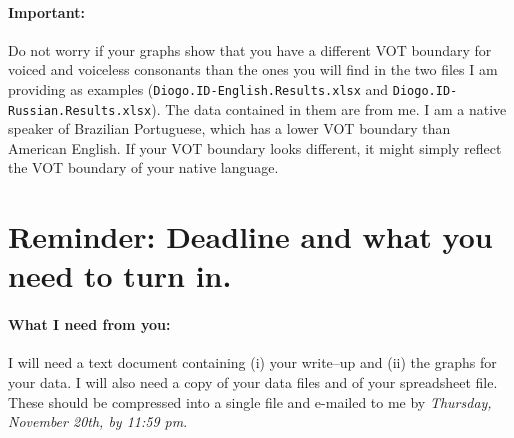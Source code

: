 \documentclass{article}
\newcommand{\filefmat}[1]{\texttt{#1}}
\newcommand{\deadline}{\emph{Thursday, November 20th, by 11:59 pm}}
\begin{document}
\paragraph{Important:} Do not worry if your graphs show that you have a different VOT boundary for voiced and voiceless consonants than the ones you will find in the two files I am providing as examples (\filefmat{Diogo.ID-English.Results.xlsx} and \filefmat{Diogo.ID-Russian.Results.xlsx}). The data contained in them are from me. I am a native speaker of Brazilian Portuguese, which has a lower VOT boundary than American English. If your VOT boundary looks different, it might simply reflect the VOT boundary of your native language.

\section{Reminder: Deadline and what you need to turn in.}

\paragraph{What I need from you:} I will need a text document containing (i) your write--up and (ii) the graphs for your data. I will also need a copy of your data files and of your spreadsheet file. These should be compressed into a single file and e-mailed to me by \deadline{}.
\end{document}
